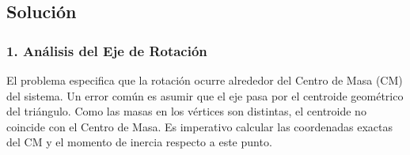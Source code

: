 \documentclass[12pt, a4paper]{article}
\begin{document}
\begin{center}
\end{center}

\subsection*{Solución}

\subsubsection*{1. Análisis del Eje de Rotación}
El problema especifica que la rotación ocurre alrededor del Centro de Masa (CM) del sistema. Un error común es asumir que el eje pasa por el centroide geométrico del triángulo. Como las masas en los vértices son distintas, el centroide no coincide con el Centro de Masa. Es imperativo calcular las coordenadas exactas del CM y el momento de inercia respecto a este punto.
\end{document}
